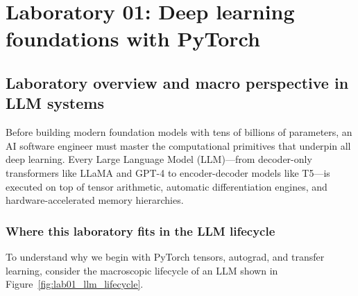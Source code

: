 \documentclass[../labs.tex]{subfiles}
\begin{document}
\chapter{Laboratory 01: Deep learning foundations with PyTorch}
\label{ch:lab01_pytorch_foundations}

\section{Laboratory overview and macro perspective in LLM systems}

Before building modern foundation models with tens of billions of parameters, an AI software engineer must master the computational primitives that underpin all deep learning. Every Large Language Model (LLM)---from decoder-only transformers like LLaMA and GPT-4 to encoder-decoder models like T5---is executed on top of tensor arithmetic, automatic differentiation engines, and hardware-accelerated memory hierarchies.

\subsection{Where this laboratory fits in the LLM lifecycle}
To understand why we begin with PyTorch tensors, autograd, and transfer learning, consider the macroscopic lifecycle of an LLM shown in Figure~\ref{fig:lab01_llm_lifecycle}.
\end{document}
